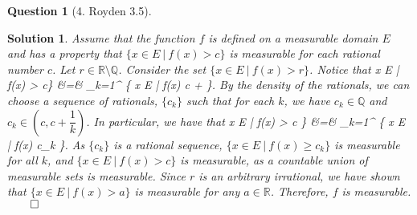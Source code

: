 \documentclass{article} %
\def\eQb#1\eQe{\begin{eqnarray*}#1\end{eqnarray*}}
\theoremstyle{quest}
\newtheorem*{question}{Question}
\newtheorem*{solution}{Solution}
\begin{document}
\begin{question}[4. Royden 3.5]
\end{question}
\begin{solution}
Assume that the function $f$ is defined on a measurable domain $E$ and has a property that
$\{ x \in E \> | \> f(x) > c \}$ is measurable for each rational number $c$. Let $r \in \mathbb{R} 
\setminus \mathbb{Q}$. Consider the set $\{ x \in E \> | \> f(x) > r \}$. Notice that
\eQb
\{ x \in E \> | \> f(x) > c\} &=& \bigcup_{k=1}^{\infty}
\{ x \in E \> | \> f(x) \geq c +  \}.
\eQe
By the density of the rationals, we can choose a sequence of rationals,
$\{ c_k \}$ such that for each $k$, we have $c_k \in \mathbb{Q}$ and 
$c_k \in (c, c + \dfrac{1}{k})$. In particular, we have that 
\eQb
\{ x \in E \> | \> f(x) > c \}
&=& \bigcup_{k=1}^{\infty} \{ x \in E \> | \> f(x) \geq c_k \}.
\eQe
As $\{ c_k \}$ is a rational sequence, 
$\{ x \in E \> | \> f(x) \geq c_k \}$ is measurable for all $k$, and 
$\{ x \in E \> | \> f(x) > c \}$ is measurable, as a countable union of measurable sets is measurable.
Since $r$ is an arbitrary irrational, we have shown that 
$\{ x \in E \> | \> f(x) > a \}$ is measurable for any $a \in \mathbb{R}$. Therefore, $f$ is 
measurable. $\qed$

\end{solution}

\bigskip
\end{document}
